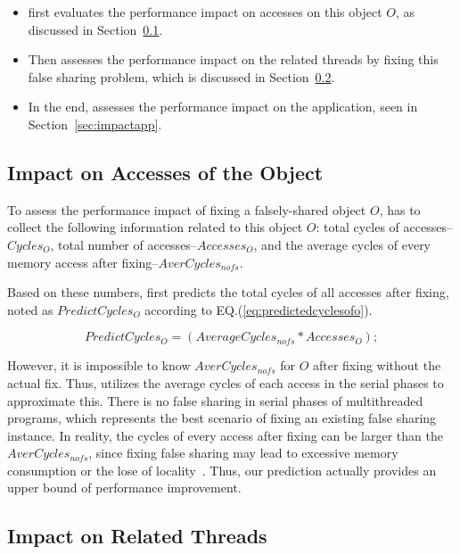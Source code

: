 \begin{itemize}
\item \cheetah{} first evaluates the performance impact on accesses on this object $O$, as discussed in Section~\ref{sec:impactobject}. 

\item Then \cheetah{} assesses the performance impact on the related threads by fixing this false sharing problem, which is discussed in Section~\ref{sec:impactthread}. 
 
\item In the end, \cheetah{} assesses the performance impact on the application, seen in Section~\ref{sec:impactapp}. 
\end{itemize}


\subsection{Impact on Accesses of the Object}
\label{sec:impactobject}

To assess the performance impact of fixing a falsely-shared object $O$, \cheetah{} has to collect the following information related to this object $O$:  total cycles of accesses-- $Cycles_O$, total number of accesses--$Accesses_O$, and the average cycles of every memory access after fixing--$AverCycles_{nofs}$.

Based on these numbers, \cheetah{} first predicts the total cycles of all accesses after fixing, noted as $PredictCycles_{O}$ according to EQ.(\ref{eq:predictedcyclesofo}).   
 
\begin{equation}
\label{eq:predictedcyclesofo}
 PredictCycles_{O} = (AverageCycles_{nofs} * Accesses_O);
\end{equation} 
 
However, it is impossible to know $AverCycles_{nofs}$ for $O$ after fixing without the actual fix. Thus, \cheetah{} utilizes the average cycles of each access in the serial phases to approximate this. There is no false sharing in serial phases of multithreaded programs, which represents the best scenario of fixing an existing false sharing instance. In reality, the cycles of every access after fixing can be larger than the $AverCycles_{nofs}$, since fixing false sharing may lead to excessive memory consumption or the lose of locality~\cite{qinzhao}. Thus, our prediction actually provides an upper bound of performance improvement. 
 
\subsection{Impact on Related Threads}
\label{sec:impactthread}

